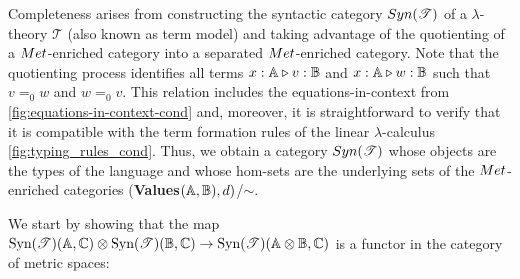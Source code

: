 \documentclass[a4paper,UKenglish,cleveref, autoref, thm-restate]{lipics-v2021}
\begin{document}
%



  Completeness arises from constructing the syntactic category $\catSyn(\mathscr{T})$ of a $\lambda$-theory $\mathscr{T}$ (also known as term model)  and taking advantage of the quotienting of a  $\catMet$-enriched category into a separated  $\catMet$-enriched category. Note that the quotienting process identifies all terms $x : \mathbb{A} \triangleright v : \mathbb{B}$ and $x : \mathbb{A} \triangleright w : \mathbb{B}$ such that $v =_0 w$ and $w =_0 v$. This relation includes the equations-in-context from \autoref{fig:equations-in-context-cond} and, moreover, it is straightforward to verify that it is compatible with the term formation rules of the linear $\lambda$-calculus \autoref{fig:typing_rules_cond}. Thus, we obtain a category $\catSyn(\mathscr{T})$ whose objects are the types of the language and whose hom-sets are the underlying sets of the  $\catMet$-enriched categories (\textbf{Values}$(\mathbb{A},\mathbb{B}),d)$/$\sim$.

  We start by showing that the map $\text{Syn}(\mathscr{T})(\mathbb{A},\mathbb{C}) \otimes \text{Syn}(\mathscr{T})(\mathbb{B},\mathbb{C}) \rightarrow
  \text{Syn}(\mathscr{T})(\mathbb{A} \otimes \mathbb{B} ,\mathbb{C})$ is a functor in the category of metric spaces:
\end{document}
